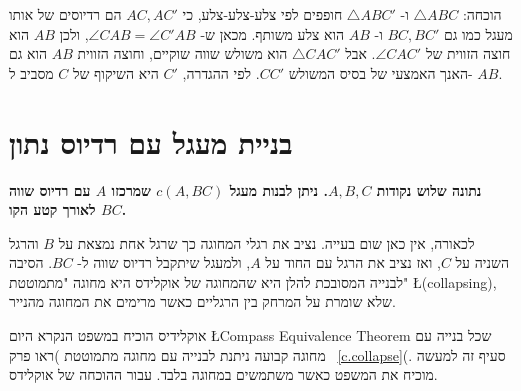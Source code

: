 \begin{center}

\end{center}
הוכחה:
$\triangle ABC$
ו-%
$\triangle ABC'$
חופפים לפי צלע-צלע-צלע, כי
$AC,AC'$
הם רדיוסים של אותו מעגל כמו גם
$BC,BC'$
ו-%
$AB$
הוא צלע משותף. מכאן ש-%
$\angle CAB = \angle C'AB$,
ולכן
$AB$
הוא חוצה הזווית של
$\angle CAC'$.
אבל
$\triangle CAC'$
הוא משולש שווה שוקיים, וחוצה הזווית
$AB$
הוא גם האנך האמצעי של בסיס המשולש
$CC'$.
לפי ההגדרה,
$C'$
היא השיקוף של
$C$
מסביב ל-%
$AB$.


\section{%
בניית מעגל עם רדיוס נתון
}\label{s.radius}

\textbf{%
נתונה שלוש נקודות
$A,B,C$.
ניתן לבנות מעגל
$c(A,BC)$
שמרכזו 
$A$
עם רדיוס שווה לאורך קטע הקו 
$BC$.
}

לכאורה, אין כאן שום בעייה. נציב את רגלי המחוגה כך שרגל אחת נמצאת על
$B$
והרגל השניה על
$C$,
ואז נציב את הרגל עם החוד על
$A$,
ולמעגל שיתקבל רדיוס שווה ל-%
$BC$.
הסיבה לבנייה המסובכת להלן היא שהמחוגה של אוקלידס היא מחוגה "מתמוטטת"
\L{(collapsing)},
שלא שומרת על המרחק בין הרגליים כאשר מרימים את המחוגה מהנייר.

\np

אוקלידיס הוכיח במשפט הנקרא היום
\L{Compass Equivalence Theorem}
שכל בנייה עם מחוגה קבועה ניתנת לבנייה עם מחוגה מתמוטטת )ראו פרק~%
\ref{c.collapse}(.
סעיף זה למעשה מוכיח את המשפט כאשר משתמשים במחוגה בלבד. עבור ההוכחה של אוקלידס.

